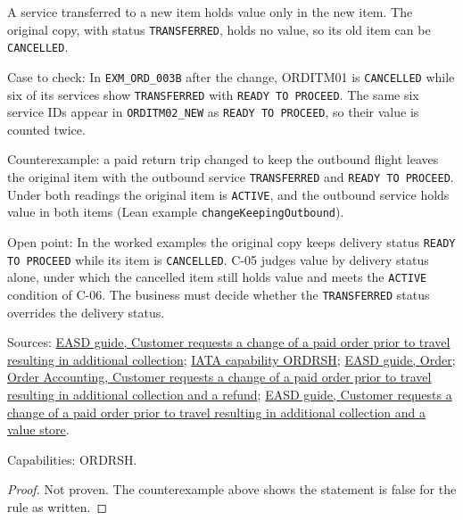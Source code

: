 \begin{theorem}
  \label{thm:change-cancellation-transferred-original-no-value}
  A service transferred to a new item holds value only in the new item. The
  original copy, with status \texttt{TRANSFERRED}, holds no value, so its
  old item can be \texttt{CANCELLED}.

  Case to check: In \texttt{EXM\_ORD\_003B} after the change, ORDITM01 is
  \texttt{CANCELLED} while six of its services show \texttt{TRANSFERRED}
  with \texttt{READY TO PROCEED}. The same six service IDs appear in
  \texttt{ORDITM02\_NEW} as \texttt{READY TO PROCEED}, so their value is
  counted twice.

  Counterexample: a paid return trip changed to keep the outbound flight
  leaves the original item with the outbound service \texttt{TRANSFERRED} and
  \texttt{READY TO PROCEED}.  Under both readings the original item is
  \texttt{ACTIVE}, and the outbound service holds value in both items (Lean
  example \texttt{changeKeepingOutbound}).

  Open point: In the worked examples the original copy keeps delivery status
  \texttt{READY TO PROCEED} while its item is \texttt{CANCELLED}. C-05
  judges value by delivery status alone, under which the cancelled item
  still holds value and meets the \texttt{ACTIVE} condition of C-06. The
  business must decide whether the \texttt{TRANSFERRED} status overrides the
  delivery status.

  Sources: \href{https://standards.atlassian.net/wiki/spaces/EASD/pages/841187358}{EASD guide, Customer requests a change of a paid order prior to travel resulting in additional collection};
  \href{https://retailing.iata.org/armi/docs/ORDRSH/}{IATA capability ORDRSH};
  \href{https://standards.atlassian.net/wiki/spaces/EASD/pages/574849062/Order}{EASD guide, Order};
  \href{https://standards.atlassian.net/wiki/spaces/OA/pages/844202130}{Order Accounting, Customer requests a change of a paid order prior to travel resulting in additional collection and a refund};
  \href{https://standards.atlassian.net/wiki/spaces/EASD/pages/842268712}{EASD guide, Customer requests a change of a paid order prior to travel resulting in additional collection and a value store}.

  Capabilities: ORDRSH.
\end{theorem}
\begin{proof}
  Not proven.  The counterexample above shows the statement is false for the
  rule as written.
\end{proof}

